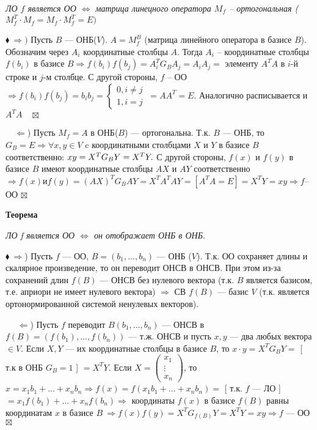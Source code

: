 \documentclass[a4paper, 12pt]{report}
\begin{document}
	\textit{ЛО $f$ является ОО $\Longleftrightarrow$ матрица линецного оператора $M_{f}$ -- ортогональная ($M_{f}^T \cdot M_{f} = M_{f} \cdot M_{f}^T = E)$}
	\par\bigskip
	$\blacklozenge\  \Rightarrow)$ Пусть $B$ --- ОНБ($V$).  $A = M_{f}^B$ (матрица линейного оператора в базисе $B$). Обозначим через $A_i$ координатные столбцы $A$. Тогда $A_i$ -- координатные столбцы $f(b_i)$ в базисе $B \Rightarrow f(b_i)f(b_j) = A_i^TG_BA_j = A_iA_j =$ элементу $A^TA$ в $i$-й строке и $j$-м столбце. С другой стороны, $f$ -- ОО $\Rightarrow f(b_i)f(b_j)= \begin{equation*}
		b_ib_j= 
		\begin{cases}
			0, i \neq j\\
			1, i = j
		\end{cases}
	\end{equation*} \ = AA^T = E$. Аналогично расписывается и $A^TA\quad\boxtimes$ 
	
	$\quad \Leftarrow$) Пусть $M_f = A $ в ОНБ($B$) --- ортогональна. Т.к. $B$ --- ОНБ, то $ G_B = E \Rightarrow \forall x, y \in V$ c координатными столбцами $X$ и $Y$ в базисе $B$ соответственно: $xy = X^TG_BY = X^TY.\\$
	С другой стороны,  $f(x)$ и $f(y)$ в базисе $B$ имеют координатные столбцы $AX$ и $AY$ соответственно $\Rightarrow f(x) и f(y) = (AX)^TG_BAY = X^TA^TAY=[A^TA=E] = X^TY = xy \Rightarrow f $-- ОО $ \boxtimes$  
	\par\bigskip
	\textbf{Теорема}
	
	\textit{ЛО f является ОО $\Longleftrightarrow$ он отображает ОНБ в ОНБ}.
	\par\bigskip
	$\blacklozenge\  \Rightarrow$) Пусть $f$ --- ОО, $ B = (b_1,..., b_n)$ --- ОНБ ($V$). Т.к. ОО сохраняет длины и скалярное произведение, то он переводит ОНСВ в ОНСВ.  При этом из-за сохранений длин $f(B)$ --- ОНСВ без нулевого вектора (т.к. $B$ является базисом, т.е. априори не имеет нулевого вектора) $ \Rightarrow $ СВ $f(B)$ --- базис $V$ (т.к. является ортонормированной системой ненулевых векторов). 
	
	$\quad$ $\Leftarrow$) Пусть $f$ переводит $B(b_1,..., b_n)$ --- ОНСВ в $f(B) = (f(b_1), ..., f(b_n))$ --- т.ж. ОНСВ и пусть $ x,y$ --- два любых вектора $ \in V$. Если $X,Y$ --- их координатные столбцы в базисе $B$, то $x \cdot y = X^TG_BY = $ [ т.к в ОНБ $G_B = 1$ ] $ = X^TY.$ Если $ X = \begin{pmatrix}x_1\\ \vdots \\ x_n\end{pmatrix}$, то $x = x_1b_1+ ... + x_nb_n \Rightarrow f(x) = f(x_1b_1 + ... + x_nb_n) = $ [ т.к. $f$ --- ЛО ] $ = x_1f(b_1)+ ... + x_nf(b_n) \Rightarrow $ координаты $f(x)$ в базисе $f(B)$ равны координатам $x$ в базисе $B\  \Rightarrow  f(x)f(y) = X^TG_{f(B)}Y = X^TY = xy  \Rightarrow f$ --- ОО $\boxtimes$
	
\end{document}
